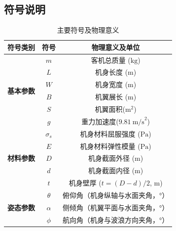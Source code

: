 \documentclass{cumcmthesis}
\begin{document}
\subsection{符号说明}
\begin{table}[H]
\centering
\caption{主要符号及物理意义}
\label{tab:symbol}
\begin{tabular}{|c|c|c|}
\hline
\textbf{符号类别} & \textbf{符号} & \textbf{物理意义及单位} \\
\hline
\multirow{6}{*}{\textbf{基本参数}} 
& \( m \) & 客机总质量 (\( \text{kg} \)) \\ \cline{2-3}
& \( L \) & 机身长度 (\( \text{m} \)) \\ \cline{2-3}
& \( W \) & 机身宽度 (\( \text{m} \)) \\ \cline{2-3}
& \( B \) & 机翼展长 (\( \text{m} \)) \\ \cline{2-3}
& \( S \) & 机翼面积(\( \text{m}^2 \)) \\ \cline{2-3}
& \( g \) & 重力加速度(\( 9.81\ \text{m/s}^2 \))\\
\hline
\multirow{5}{*}{\textbf{材料参数}} 
& \( \sigma_s \) & 机身材料屈服强度 (\( \text{Pa} \)) \\ \cline{2-3}
& \( E \) & 机身材料弹性模量 (\( \text{Pa} \)) \\ \cline{2-3}
& \( D \) & 机身截面外径 (\( \text{m} \)) \\ \cline{2-3}
& \( d \) & 机身截面内径 (\( \text{m} \)) \\ \cline{2-3}
& \( t \) & 机身壁厚 (\( t=(D-d)/2 \), m) \\
\hline
\multirow{3}{*}{\textbf{姿态参数}} 
& \( \theta \) & 俯仰角（机身纵轴与水面夹角，°） \\ \cline{2-3}
& \( \alpha \) & 侧倾角（机翼平面与水面夹角，°） \\ \cline{2-3}
& \( \phi \) & 航向角（机身与波浪方向夹角，°） \\
\hline
\end{tabular}
\end{table}
\end{document}
